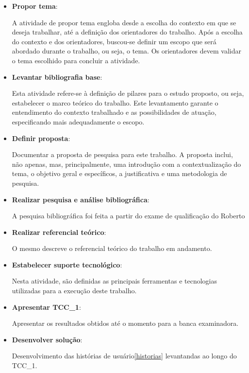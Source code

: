 \begin{itemize}
	\item \textbf{Propor tema}:

		A atividade de propor tema engloba desde a escolha do contexto em que se deseja trabalhar, até a definição dos orientadores do trabalho. Após a escolha do contexto e dos orientadores, buscou-se definir um escopo que será abordado durante o trabalho, ou seja, o tema. Os orientadores devem validar o tema escolhido para concluir a atividade.

	\item \textbf{Levantar bibliografia base}:

		Esta atividade refere-se à definição de pilares para o estudo proposto, ou seja, estabelecer o marco teórico do trabalho. Este levantamento garante o entendimento do contexto trabalhado e as possibilidades de atuação, especificando mais adequadamente o escopo.

	\item \textbf{Definir proposta}:

		Documentar a proposta de pesquisa para este trabalho. A proposta inclui, não apenas, mas, principalmente, uma introdução com a contextualização do tema, o objetivo geral e específicos, a justificativa e uma metodologia de pesquisa.

	\item \textbf{Realizar pesquisa e análise bibliográfica}:

		A pesquisa bibliográfica foi feita a partir do exame de qualificação do Roberto \cite{roberto}

	\item \textbf{Realizar referencial teórico}:

		O mesmo descreve o referencial teórico do trabalho em andamento.

	\item \textbf{Estabelecer suporte tecnológico}:

		Nesta atividade, são definidas as principais ferramentas e tecnologias utilizadas para a execução deste trabalho.

	\item \textbf{Apresentar TCC\_1}:

		Apresentar os resultados obtidos até o momento para a banca examinadora.

  \item \textbf{Desenvolver solução}:

    Desenvolvimento das histórias de usuário\ref{historias} levantandas ao longo do TCC\_1.


\end{itemize}

